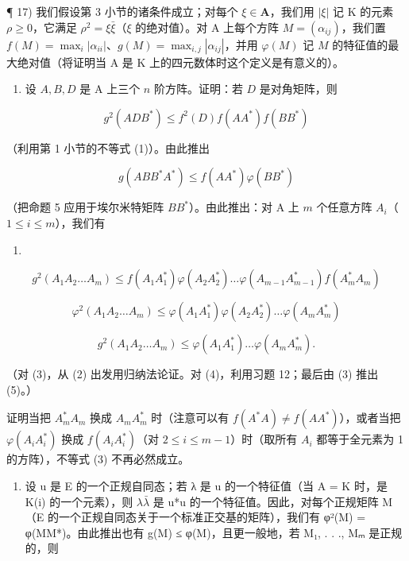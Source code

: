 ¶ 17) 我们假设第 3 小节的诸条件成立；对每个 \(\xi\in\mathbf{A}\)，我们用 \(|\xi|\) 记 K 的元素 \(\rho\geqslant0\)，它满足 \(\rho^{2}=\xi\bar{\xi}\)（\(\xi\) 的绝对值）。对 A 上每个方阵 \(M=(\alpha_{ij})\)，我们置 \(f(M)=\max_{i}|\alpha_{ii}|\)、\(g(M)=\max_{i,j}|\alpha_{ij}|\)，并用 \(\varphi(M)\) 记 \(M\) 的特征值的最大绝对值（将证明当 A 是 K 上的四元数体时这个定义是有意义的）。

\begin{enumerate}
\def\labelenumi{\alph{enumi})}
\tightlist
\item
  设 \(A, B, D\) 是 A 上三个 \(n\) 阶方阵。证明：若 \(D\) 是对角矩阵，则
\end{enumerate}

\[
g ^ {2} (A D B ^ {*}) \leqslant f ^ {2} (D) f (A A ^ {*}) f (B B ^ {*})\tag{1}
\]

（利用第 1 小节的不等式 (1)）。由此推出

\[
g (A B B ^ {*} A ^ {*}) \leqslant f (A A ^ {*}) \varphi (B B ^ {*})\tag{2}
\]

（把命题 5 应用于埃尔米特矩阵 \(BB^{*}\)）。由此推出：对 A 上 \(m\) 个任意方阵 \(A_{i}\)（\(1 \leqslant i \leqslant m\)），我们有

\begin{enumerate}
\def\labelenumi{(\arabic{enumi})}
\setcounter{enumi}{2}
\tightlist
\item
\end{enumerate}

\[
g ^ {2} (A _ {1} A _ {2} \dots A _ {m}) \leqslant f (A _ {1} A _ {1} ^ {*}) \varphi (A _ {2} A _ {2} ^ {*}) \dots \varphi (A _ {m - 1} A _ {m - 1} ^ {*}) f (A _ {m} ^ {*} A _ {m})\tag{4}
\]

\[
\varphi^ {2} (A _ {1} A _ {2} \dots A _ {m}) \leqslant \varphi (A _ {1} A _ {1} ^ {*}) \varphi (A _ {2} A _ {2} ^ {*}) \dots \varphi (A _ {m} A _ {m} ^ {*})\tag{5}
\]

\[
g ^ {2} (A _ {1} A _ {2} \dots A _ {m}) \leqslant \varphi (A _ {1} A _ {1} ^ {*}) \dots \varphi (A _ {m} A _ {m} ^ {*}).
\]

（对 (3)，从 (2) 出发用归纳法论证。对 (4)，利用习题 12；最后由 (3) 推出 (5)。）

  证明当把 \(A_{m}^{*}A_{m}\) 换成 \(A_{m}A_{m}^{*}\) 时（注意可以有 \(f(A^{*}A)\neq f(A A^{*})\)），或者当把 \(\varphi(A_{i}A_{i}^{*})\) 换成 \(f(A_{i}A_{i}^{*})\)（对 \(2\leqslant i\leqslant m-1\)）时（取所有 \(A_{i}\) 都等于全元素为 1 的方阵），不等式 (3) 不再必然成立。

\begin{enumerate}
\def\labelenumi{\alph{enumi})}
\setcounter{enumi}{1}
\tightlist
\item
  设 u 是 E 的一个正规自同态；若 λ 是 u 的一个特征值（当 A = K 时，是 K(i) 的一个元素），则 \(\lambda\bar{\lambda}\) 是 u*u 的一个特征值。因此，对每个正规矩阵 M（E 的一个正规自同态关于一个标准正交基的矩阵），我们有 φ²(M) = φ(MM*)。由此推出也有 g(M) ≤ φ(M)，且更一般地，若 M₁, . . ., Mₘ 是正规的，则
\end{enumerate}

